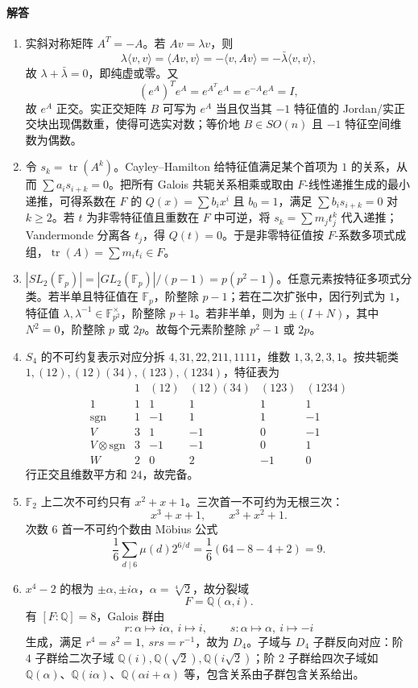 \documentclass[UTF8,12pt]{ctexart}
\begin{document}
\paragraph{解答}
\begin{enumerate}[label=\textbf{\arabic*.},leftmargin=2.2em]
\item 实斜对称矩阵 \(A^T=-A\)。若 \(Av=\lambda v\)，则
\[
\lambda\langle v,v\rangle=\langle Av,v\rangle=-\langle v,Av\rangle=-\bar\lambda\langle v,v\rangle,
\]
故 \(\lambda+\bar\lambda=0\)，即纯虚或零。又
\[
(e^A)^Te^A=e^{A^T}e^A=e^{-A}e^A=I,
\]
故 \(e^A\) 正交。实正交矩阵 \(B\) 可写为 \(e^A\) 当且仅当其 \(-1\) 特征值的 Jordan/实正交块出现偶数重，使得可选实对数；等价地 \(B\in SO(n)\) 且 \(-1\) 特征空间维数为偶数。
\item 令 \(s_k=\operatorname{tr}(A^k)\)。Cayley--Hamilton 给特征值满足某个首项为 \(1\) 的关系，从而 \(\sum a_i s_{i+k}=0\)。把所有 Galois 共轭关系相乘或取由 \(F\)-线性递推生成的最小递推，可得系数在 \(F\) 的 \(Q(x)=\sum b_ix^i\) 且 \(b_0=1\)，满足 \(\sum b_i s_{i+k}=0\) 对 \(k\ge2\)。若 \(t\) 为非零特征值且重数在 \(F\) 中可逆，将 \(s_k=\sum m_jt_j^k\) 代入递推；Vandermonde 分离各 \(t_j\)，得 \(Q(t)=0\)。于是非零特征值按 \(F\)-系数多项式成组，\(\operatorname{tr}(A)=\sum m_it_i\in F\)。
\item \(|SL_2(\mathbb F_p)|=|GL_2(\mathbb F_p)|/(p-1)=p(p^2-1)\)。任意元素按特征多项式分类。若半单且特征值在 \(\mathbb F_p\)，阶整除 \(p-1\)；若在二次扩张中，因行列式为 \(1\)，特征值 \(\lambda,\lambda^{-1}\in\mathbb F_{p^2}^\times\)，阶整除 \(p+1\)。若非半单，则为 \(\pm(I+N)\)，其中 \(N^2=0\)，阶整除 \(p\) 或 \(2p\)。故每个元素阶整除 \(p^2-1\) 或 \(2p\)。
\item \(S_4\) 的不可约复表示对应分拆 \(4,31,22,211,1111\)，维数 \(1,3,2,3,1\)。按共轭类 \(1,(12),(12)(34),(123),(1234)\)，特征表为
\[
\begin{array}{c|ccccc}
&1&(12)&(12)(34)&(123)&(1234)\\
1&1&1&1&1&1\\
\mathrm{sgn}&1&-1&1&1&-1\\
V&3&1&-1&0&-1\\
V\otimes\mathrm{sgn}&3&-1&-1&0&1\\
W&2&0&2&-1&0
\end{array}
\]
行正交且维数平方和 \(24\)，故完备。
\item \(\mathbb F_2\) 上二次不可约只有 \(x^2+x+1\)。三次首一不可约为无根三次：
\[
x^3+x+1,\qquad x^3+x^2+1.
\]
次数 \(6\) 首一不可约个数由 Möbius 公式
\[
\frac1{6}\sum_{d\mid6}\mu(d)2^{6/d}
=\frac16(64-8-4+2)=9.
\]
\item \(x^4-2\) 的根为 \(\pm\alpha,\pm i\alpha\)，\(\alpha=\sqrt[4]{2}\)，故分裂域
\[
F=\mathbb Q(\alpha,i).
\]
有 \([F:\mathbb Q]=8\)，Galois 群由
\[
r:\alpha\mapsto i\alpha,\ i\mapsto i,\qquad s:\alpha\mapsto\alpha,\ i\mapsto -i
\]
生成，满足 \(r^4=s^2=1,\ srs=r^{-1}\)，故为 \(D_4\)。子域与 \(D_4\) 子群反向对应：阶 \(4\) 子群给二次子域 \(\mathbb Q(i),\mathbb Q(\sqrt2),\mathbb Q(i\sqrt2)\)；阶 \(2\) 子群给四次子域如 \(\mathbb Q(\alpha)\)、\(\mathbb Q(i\alpha)\)、\(\mathbb Q(\alpha i+\alpha)\) 等，包含关系由子群包含关系给出。
\end{enumerate}
\end{document}
